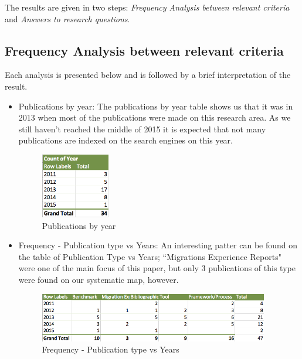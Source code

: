 \documentclass{article}
\begin{document}
The results are given in two steps: \textit{Frequency Analysis between relevant criteria} and \textit{Answers to research questions}. 

\subsection{Frequency Analysis between relevant criteria}
\label{frequencyAnalysis}

Each analysis is presented below and is followed by a brief interpretation of the result. 



\begin{itemize}
\item{Publications by year: }
The publications by year table shows us that it was in 2013 when most of the publications were made on this research area. As we still haven't reached  the middle of 2015 it is expected that not many publications are indexed on the search engines on this year.
\begin{figure}[htb!]
\centering
\includegraphics[width=30mm]{graph2.png}
\caption{Publications by year}
\end{figure}



\item {Frequency - Publication type vs Years: }
An interesting patter can be found on the table of Publication Type vs Years; ``Migrations Experience Reports" were one of the main focus of this paper, but only 3 publications of this type were found on our systematic map, however. 

\begin{figure}[htb!]
\centering
\includegraphics[width=100mm]{graph1.png}
\caption{Frequency - Publication type vs Years}
\end{figure}



\end{itemize}
\end{document}

